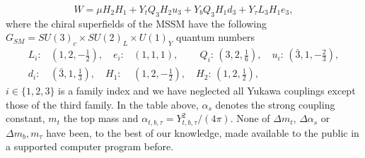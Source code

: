 \documentclass[final,3p,times,pdflatex]{elsarticle}
\begin{document}
\begin{equation}
W=\mu H_2 H_1 + Y_t Q_3 H_2 u_3 + Y_b Q_3 H_1 d_3 + Y_\tau L_3 H_1 e_3,
\end{equation}
where the chiral superfields of the MSSM have the 
following $G_{SM}=SU(3)_c\times SU(2)_L\times U(1)_Y$ quantum numbers
\begin{eqnarray}
L_i:&(1,2,-\frac{1}{2}),\quad {e}_i:&(1,1,1),\qquad\, Q_i:\,(3,2,\frac{1}{6}),\quad
{u}_i:\,({\bar 3},1,-\frac{2}{3}),\nonumber\\ {d}_i:&({\bar
  3},1,\frac{1}{3}),\quad 
H_1:&(1,2,-\frac{1}{2}),\quad  H_2:\,(1,2,\frac{1}{2}),
\label{fields}
\end{eqnarray}
$i \in \{ 1,2,3\}$ is a family index and we have neglected all Yukawa
couplings except those of the third family.
In the table above, $\alpha_s$ denotes the strong coupling constant, $m_t$ the
top mass and
$\alpha_{t,b,\tau}=Y_{t,b,\tau}^2 / (4 \pi)$. 
None of $\Delta m_t$, $\Delta \alpha_s$ or $\Delta m_b, m_\tau$ have been, to
the best of our knowledge, made available to the public in a supported
computer program before. 
\end{document}
